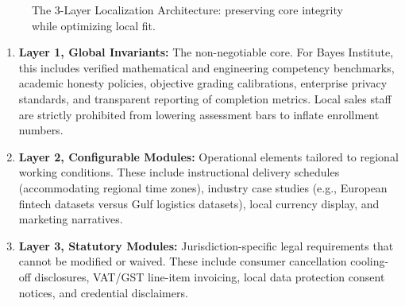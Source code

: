 \begin{figure}[htbp]
\centering
{}
\caption{The 3-Layer Localization Architecture: preserving core integrity while optimizing local fit.}
\label{fig:localization_layers}
\end{figure}

\begin{enumerate}
    \item \textbf{Layer 1, Global Invariants:} The non-negotiable core. For Bayes Institute, this includes verified mathematical and engineering competency benchmarks, academic honesty policies, objective grading calibrations, enterprise privacy standards, and transparent reporting of completion metrics. Local sales staff are strictly prohibited from lowering assessment bars to inflate enrollment numbers.
    \item \textbf{Layer 2, Configurable Modules:} Operational elements tailored to regional working conditions. These include instructional delivery schedules (accommodating regional time zones), industry case studies (e.g., European fintech datasets versus Gulf logistics datasets), local currency display, and marketing narratives.
    \item \textbf{Layer 3, Statutory Modules:} Jurisdiction-specific legal requirements that cannot be modified or waived. These include consumer cancellation cooling-off disclosures, VAT/GST line-item invoicing, local data protection consent notices, and credential disclaimers.
\end{enumerate}

